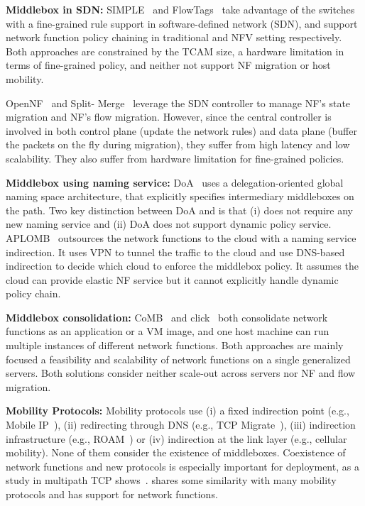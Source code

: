 \textbf{Middlebox in SDN:}
SIMPLE~\cite{SIMPLE} and FlowTags~\cite{FLOWTAGS} take advantage of the switches with a fine-grained rule support in software-defined network (SDN), and support network function policy chaining in traditional and NFV setting respectively. Both approaches are constrained by the TCAM size, a hardware limitation in terms of fine-grained policy, and neither not support NF migration or host mobility. 

OpenNF~\cite{OpenNF} and Split- Merge~\cite{splitmerge} leverage the SDN controller to manage NF's state migration and NF's flow migration. However, since the central controller is involved in both control plane (update the network rules) and data plane (buffer the packets on the fly during migration), they suffer from high latency and low scalability. They also suffer from hardware limitation for fine-grained policies.  

\textbf{Middlebox using naming service:}
DoA~\cite{DOA} uses a delegation-oriented global naming space architecture, that explicitly specifies intermediary middleboxes on the path. Two key distinction between DoA and \system is that (i) \system does not require any new naming service and (ii) DoA does not support dynamic policy service. APLOMB~\cite{Aplomb} outsources the network functions to the cloud with a naming service indirection. It uses VPN to tunnel the traffic to the cloud and use DNS-based indirection to decide which cloud to enforce the middlebox policy. It assumes the cloud can provide elastic NF service but it cannot explicitly handle dynamic policy chain. 


\textbf{Middlebox consolidation:}
CoMB~\cite{COMB} and click~\cite{ClickOS, click} both consolidate network functions as an application or a VM image, and one host machine can run multiple instances of different network functions. Both approaches are mainly focused a feasibility and scalability of network functions on a single generalized servers. Both solutions consider neither scale-out across servers nor NF and flow migration.

\textbf{Mobility Protocols:}
Mobility protocols use (i) a fixed indirection point (e.g., Mobile IP~\cite{mip}), (ii) redirecting through DNS (e.g., TCP Migrate~\cite{TCPMobile}), (iii) indirection infrastructure (e.g., ROAM~\cite{I3Mobile}) or (iv) indirection at the link layer (e.g., cellular mobility). None of them consider the existence of middleboxes. Coexistence of network functions and new protocols is especially important for deployment, as a study in multipath TCP shows~\cite{MPTCP}. \system shares some similarity with many mobility protocols and has support for network functions.   
